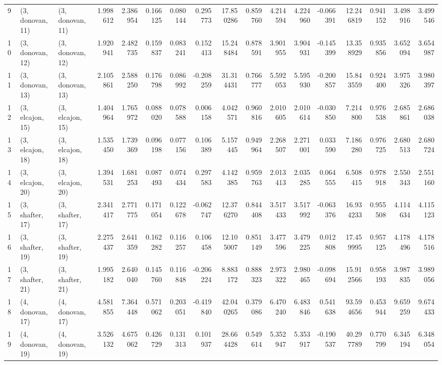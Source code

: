 \begin{tabular}{lllrrrrrrrrrrrrrr}
9  &  (3, donovan, 11) &  (3, donovan, 11) &  1.998612 &  2.386954 &   0.166125 &  0.080144 &  0.295773 &  17.850286 &  0.859760 &   4.214594 &  4.224960 & -0.066391 &  12.246819 &  0.941152 &  3.498916 &  3.499546 \\
10 &  (3, donovan, 12) &  (3, donovan, 12) &  1.920941 &  2.482735 &   0.159837 &  0.083241 &  0.152413 &  15.248484 &  0.878591 &   3.901955 &  3.904931 & -0.145399 &  13.358929 &  0.935856 &  3.652094 &  3.654987 \\
11 &  (3, donovan, 13) &  (3, donovan, 13) &  2.105861 &  2.588250 &   0.176798 &  0.086992 & -0.208259 &  31.314431 &  0.766777 &   5.592053 &  5.595930 & -0.200857 &  15.843559 &  0.924400 &  3.975326 &  3.980397 \\
12 &  (3, elcajon, 15) &  (3, elcajon, 15) &  1.404964 &  1.765972 &   0.088020 &  0.078588 &  0.006158 &   4.042571 &  0.960816 &   2.010605 &  2.010614 & -0.030850 &   7.214800 &  0.976538 &  2.685861 &  2.686038 \\
13 &  (3, elcajon, 18) &  (3, elcajon, 18) &  1.535450 &  1.739369 &   0.096198 &  0.077156 &  0.106389 &   5.157445 &  0.949964 &   2.268507 &  2.271001 &  0.033590 &   7.186280 &  0.976725 &  2.680513 &  2.680724 \\
14 &  (3, elcajon, 20) &  (3, elcajon, 20) &  1.394531 &  1.681253 &   0.087493 &  0.074434 &  0.297583 &   4.142385 &  0.959763 &   2.013413 &  2.035285 &  0.064555 &   6.508415 &  0.978918 &  2.550343 &  2.551160 \\
15 &  (3, shafter, 17) &  (3, shafter, 17) &  2.341417 &  2.771775 &   0.171054 &  0.122678 & -0.062747 &  12.376270 &  0.844408 &   3.517433 &  3.517992 & -0.063376 &  16.934233 &  0.955508 &  4.114634 &  4.115123 \\
16 &  (3, shafter, 19) &  (3, shafter, 19) &  2.275437 &  2.641359 &   0.162282 &  0.116257 &  0.106458 &  12.105007 &  0.851149 &   3.477596 &  3.479225 &  0.012808 &  17.459995 &  0.957125 &  4.178496 &  4.178516 \\
17 &  (3, shafter, 21) &  (3, shafter, 21) &  1.995182 &  2.640040 &   0.145760 &  0.116848 & -0.206224 &   8.883172 &  0.888323 &   2.973322 &  2.980465 & -0.098694 &  15.912566 &  0.958193 &  3.987835 &  3.989056 \\
18 &  (4, donovan, 17) &  (4, donovan, 17) &  4.581855 &  7.364448 &   0.571062 &  0.203051 & -0.419840 &  42.040265 &  0.379086 &   6.470240 &  6.483846 &  0.541638 &  93.594656 &  0.453944 &  9.659259 &  9.674433 \\
19 &  (4, donovan, 19) &  (4, donovan, 19) &  3.526132 &  4.675062 &   0.426729 &  0.131313 &  0.101937 &  28.664428 &  0.549614 &   5.352947 &  5.353917 & -0.190537 &  40.297789 &  0.770799 &  6.345194 &  6.348054 \\

\end{tabular}
